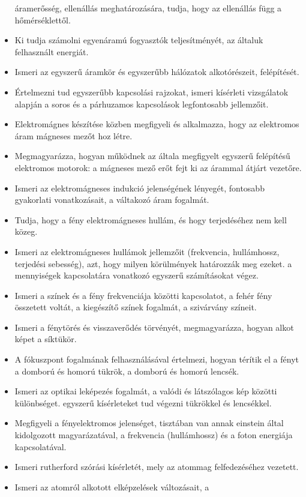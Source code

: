 \begin{itemize}
  áramerősség, ellenállás meghatározására, tudja, hogy az ellenállás
  függ a hőmérséklettől.
\item
  Ki tudja számolni egyenáramú fogyasztók teljesítményét, az általuk
  felhasznált energiát.
\item
  Ismeri az egyszerű áramkör és egyszerűbb hálózatok alkotórészeit,
  felépítését.
\item
  Értelmezni tud egyszerűbb kapcsolási rajzokat, ismeri kísérleti
  vizsgálatok alapján a soros és a párhuzamos kapcsolások legfontosabb
  jellemzőit.
\item
  Elektromágnes készítése közben megfigyeli és alkalmazza, hogy az
  elektromos áram mágneses mezőt hoz létre.
\item
  Megmagyarázza, hogyan működnek az általa megfigyelt egyszerű
  felépítésű elektromos motorok: a mágneses mező erőt fejt ki az árammal
  átjárt vezetőre.
\item
  Ismeri az elektromágneses indukció jelenségének lényegét, fontosabb
  gyakorlati vonatkozásait, a váltakozó áram fogalmát.
\item
  Tudja, hogy a fény elektromágneses hullám, és hogy terjedéséhez nem
  kell közeg.
\item
  Ismeri az elektromágneses hullámok jellemzőit (frekvencia,
  hullámhossz, terjedési sebesség), azt, hogy milyen körülmények
  határozzák meg ezeket. a mennyiségek kapcsolatára vonatkozó egyszerű
  számításokat végez.
\item
  Ismeri a színek és a fény frekvenciája közötti kapcsolatot, a fehér
  fény összetett voltát, a kiegészítő színek fogalmát, a szivárvány
  színeit.
\item
  Ismeri a fénytörés és visszaverődés törvényét, megmagyarázza, hogyan
  alkot képet a síktükör.
\item
  A fókuszpont fogalmának felhasználásával értelmezi, hogyan térítik el
  a fényt a domború és homorú tükrök, a domború és homorú lencsék.
\item
  Ismeri az optikai leképezés fogalmát, a valódi és látszólagos kép
  közötti különbséget. egyszerű kísérleteket tud végezni tükrökkel és
  lencsékkel.
\item
  Megfigyeli a fényelektromos jelenséget, tisztában van annak einstein
  által kidolgozott magyarázatával, a frekvencia (hullámhossz) és a
  foton energiája kapcsolatával.
\item
  Ismeri rutherford szórási kísérletét, mely az atommag felfedezéséhez
  vezetett.
\item
  Ismeri az atomról alkotott elképzelések változásait, a

\end{itemize}
